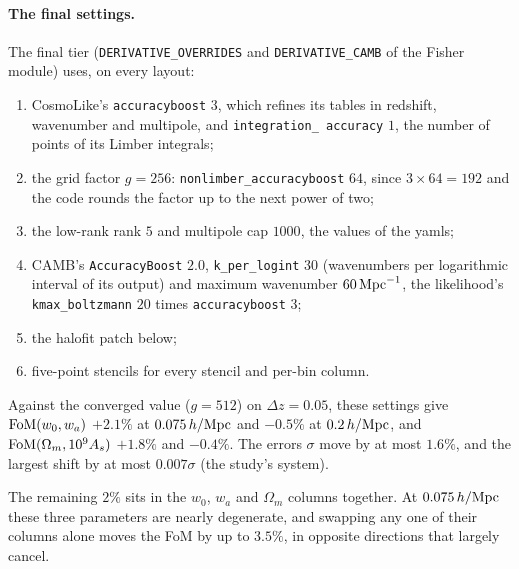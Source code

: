\documentclass[11pt]{article}
\newcommand{\hMpc}{\,h/{\rm Mpc}}
\newcommand{\us}{\_\allowbreak}
\begin{document}
\paragraph{The final settings.}
The final tier (\texttt{DERIVATIVE\us OVERRIDES} and
\texttt{DERIVATIVE\us CAMB} of the Fisher module) uses, on every
layout:
\begin{enumerate}
  \item CosmoLike's \texttt{accuracyboost} $3$, which refines its tables
    in redshift, wavenumber and multipole, and \texttt{integration\us
    accuracy} $1$, the number of points of its Limber integrals;
  \item the grid factor $g = 256$: \texttt{nonlimber\us accuracyboost}
    $64$, since $3 \times 64 = 192$ and the code rounds the factor up to
    the next power of two;
  \item the low-rank rank $5$ and multipole cap $1000$, the values of
    the yamls;
  \item CAMB's \texttt{AccuracyBoost} $2.0$, \texttt{k\us per\us logint}
    $30$ (wavenumbers per logarithmic interval of its output) and
    maximum wavenumber $60\,{\rm Mpc}^{-1}$, the likelihood's
    \texttt{kmax\us boltzmann} $20$ times \texttt{accuracyboost} $3$;
  \item the halofit patch below;
  \item five-point stencils for every stencil and per-bin column.
\end{enumerate}

Against the converged value ($g = 512$) on $\Delta z = 0.05$, these
settings give
${\rm FoM}(w_0, w_a)$ $+2.1\%$ at $0.075\hMpc$ and $-0.5\%$ at
$0.2\hMpc$, and ${\rm FoM}(\Omega_m, 10^9 A_s)$ $+1.8\%$ and $-0.4\%$.
The errors $\sigma$ move by at most $1.6\%$, and the largest shift by at
most $0.007\sigma$ (the study's system).

The remaining $2\%$ sits in the $w_0$, $w_a$ and $\Omega_m$ columns
together.  At $0.075\hMpc$ these three parameters are nearly degenerate,
and swapping any one of their columns alone moves the FoM by up to
$3.5\%$, in opposite directions that largely cancel.
\end{document}
